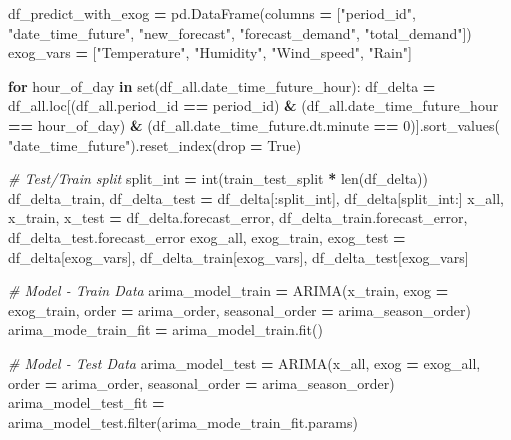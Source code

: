 \documentclass[mstat,12pt]{unswthesis}
\newenvironment{Shaded}{\begin{snugshade}}{\end{snugshade}}
\newcommand{\BuiltInTok}[1]{#1}
\newcommand{\CommentTok}[1]{\textcolor[rgb]{0.56,0.35,0.01}{\textit{#1}}}
\newcommand{\ControlFlowTok}[1]{\textcolor[rgb]{0.13,0.29,0.53}{\textbf{#1}}}
\newcommand{\DecValTok}[1]{\textcolor[rgb]{0.00,0.00,0.81}{#1}}
\newcommand{\KeywordTok}[1]{\textcolor[rgb]{0.13,0.29,0.53}{\textbf{#1}}}
\newcommand{\NormalTok}[1]{#1}
\newcommand{\OperatorTok}[1]{\textcolor[rgb]{0.81,0.36,0.00}{\textbf{#1}}}
\newcommand{\StringTok}[1]{\textcolor[rgb]{0.31,0.60,0.02}{#1}}
\newcommand{\VariableTok}[1]{\textcolor[rgb]{0.00,0.00,0.00}{#1}}
\begin{document}
\begin{Shaded}
\begin{Highlighting}[]
\NormalTok{df\_predict\_with\_exog }\OperatorTok{=}\NormalTok{ pd.DataFrame(columns }\OperatorTok{=}\NormalTok{ [}\StringTok{"period\_id"}\NormalTok{,}
    \StringTok{"date\_time\_future"}\NormalTok{, }\StringTok{"new\_forecast"}\NormalTok{, }\StringTok{"forecast\_demand"}\NormalTok{, }
    \StringTok{"total\_demand"}\NormalTok{])}
\NormalTok{exog\_vars }\OperatorTok{=}\NormalTok{ [}\StringTok{"Temperature"}\NormalTok{, }\StringTok{"Humidity"}\NormalTok{, }\StringTok{"Wind\_speed"}\NormalTok{, }\StringTok{"Rain"}\NormalTok{]}

\ControlFlowTok{for}\NormalTok{ hour\_of\_day }\KeywordTok{in} \BuiltInTok{set}\NormalTok{(df\_all.date\_time\_future\_hour):}
\NormalTok{    df\_delta }\OperatorTok{=}\NormalTok{ df\_all.loc[(df\_all.period\_id }\OperatorTok{==}\NormalTok{ period\_id) }\OperatorTok{\&} 
\NormalTok{    (df\_all.date\_time\_future\_hour }\OperatorTok{==}\NormalTok{ hour\_of\_day) }\OperatorTok{\&} 
\NormalTok{    (df\_all.date\_time\_future.dt.minute }\OperatorTok{==} \DecValTok{0}\NormalTok{)].sort\_values(}
        \StringTok{"date\_time\_future"}\NormalTok{).reset\_index(drop }\OperatorTok{=} \VariableTok{True}\NormalTok{)}

    \CommentTok{\# Test/Train split}
\NormalTok{    split\_int }\OperatorTok{=} \BuiltInTok{int}\NormalTok{(train\_test\_split }\OperatorTok{*} \BuiltInTok{len}\NormalTok{(df\_delta))}
\NormalTok{    df\_delta\_train, df\_delta\_test }\OperatorTok{=} 
\NormalTok{        df\_delta[:split\_int], df\_delta[split\_int:]}
\NormalTok{    x\_all, x\_train, x\_test }\OperatorTok{=} 
\NormalTok{    df\_delta.forecast\_error, df\_delta\_train.forecast\_error, }
\NormalTok{    df\_delta\_test.forecast\_error}
\NormalTok{    exog\_all, exog\_train, exog\_test }\OperatorTok{=} 
\NormalTok{    df\_delta[exog\_vars], df\_delta\_train[exog\_vars], }
\NormalTok{    df\_delta\_test[exog\_vars]}

    \CommentTok{\# Model {-} Train Data}
\NormalTok{    arima\_model\_train }\OperatorTok{=}\NormalTok{ ARIMA(x\_train, exog }\OperatorTok{=}\NormalTok{ exog\_train, }
\NormalTok{        order }\OperatorTok{=}\NormalTok{ arima\_order, seasonal\_order }\OperatorTok{=}\NormalTok{ arima\_season\_order)}
\NormalTok{    arima\_mode\_train\_fit }\OperatorTok{=}\NormalTok{ arima\_model\_train.fit()}

    \CommentTok{\# Model {-} Test Data}
\NormalTok{    arima\_model\_test }\OperatorTok{=}\NormalTok{ ARIMA(x\_all, exog }\OperatorTok{=}\NormalTok{ exog\_all, }
\NormalTok{        order }\OperatorTok{=}\NormalTok{ arima\_order, }
\NormalTok{        seasonal\_order }\OperatorTok{=}\NormalTok{ arima\_season\_order)}
\NormalTok{    arima\_model\_test\_fit }\OperatorTok{=} 
\NormalTok{      arima\_model\_test.}\BuiltInTok{filter}\NormalTok{(arima\_mode\_train\_fit.params) }


\end{Highlighting}
\end{Shaded}
\end{document}
